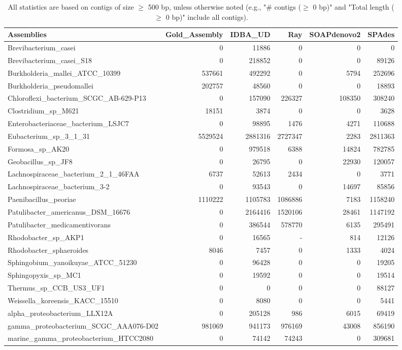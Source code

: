 \documentclass[12pt,a4paper]{article}
\begin{document}
\begin{table}[ht]
\begin{center}
\caption{All statistics are based on contigs of size $\geq$ 500 bp, unless otherwise noted (e.g., "\# contigs ($\geq$ 0 bp)" and "Total length ($\geq$ 0 bp)" include all contigs).}
\begin{tabular}{|l*{5}{|r}|}
\hline
Assemblies & Gold\_Assembly & IDBA\_UD & Ray & SOAPdenovo2 & SPAdes \\ \hline
Brevibacterium\_casei & 0 & 11886 & 0 & 0 & 0 \\ \hline
Brevibacterium\_casei\_S18 & 0 & 218852 & 0 & 0 & 89126 \\ \hline
Burkholderia\_mallei\_ATCC\_10399 & 537661 & 492292 & 0 & 5794 & 252696 \\ \hline
Burkholderia\_pseudomallei & 202757 & 48560 & 0 & 0 & 18893 \\ \hline
Chloroflexi\_bacterium\_SCGC\_AB-629-P13 & 0 & 157090 & 226327 & 108350 & 308240 \\ \hline
Clostridium\_sp\_M621 & 18151 & 3874 & 0 & 0 & 3628 \\ \hline
Enterobacteriaceae\_bacterium\_LSJC7 & 0 & 98895 & 1476 & 4271 & 110688 \\ \hline
Eubacterium\_sp\_3\_1\_31 & 5529524 & 2881316 & 2727347 & 2283 & 2811363 \\ \hline
Formosa\_sp\_AK20 & 0 & 979518 & 6388 & 14824 & 782785 \\ \hline
Geobacillus\_sp\_JF8 & 0 & 26795 & 0 & 22930 & 120057 \\ \hline
Lachnospiraceae\_bacterium\_2\_1\_46FAA & 6737 & 52613 & 2434 & 0 & 3771 \\ \hline
Lachnospiraceae\_bacterium\_3-2 & 0 & 93543 & 0 & 14697 & 85856 \\ \hline
Paenibacillus\_peoriae & 1110222 & 1105783 & 1086886 & 7183 & 1158240 \\ \hline
Patulibacter\_americanus\_DSM\_16676 & 0 & 2164416 & 1520106 & 28461 & 1147192 \\ \hline
Patulibacter\_medicamentivorans & 0 & 386544 & 578770 & 6135 & 295491 \\ \hline
Rhodobacter\_sp\_AKP1 & 0 & 16565 & - & 814 & 12126 \\ \hline
Rhodobacter\_sphaeroides & 8046 & 7457 & 0 & 1333 & 4024 \\ \hline
Sphingobium\_yanoikuyae\_ATCC\_51230 & 0 & 96428 & 0 & 0 & 19205 \\ \hline
Sphingopyxis\_sp\_MC1 & 0 & 19592 & 0 & 0 & 19514 \\ \hline
Thermus\_sp\_CCB\_US3\_UF1 & 0 & 0 & 0 & 0 & 88127 \\ \hline
Weissella\_koreensis\_KACC\_15510 & 0 & 8080 & 0 & 0 & 5441 \\ \hline
alpha\_proteobacterium\_LLX12A & 0 & 205128 & 986 & 6015 & 69419 \\ \hline
gamma\_proteobacterium\_SCGC\_AAA076-D02 & 981069 & 941173 & 976169 & 43008 & 856190 \\ \hline
marine\_gamma\_proteobacterium\_HTCC2080 & 0 & 74142 & 74243 & 0 & 309681 \\ \hline
\end{tabular}
\end{center}
\end{table}
\end{document}
